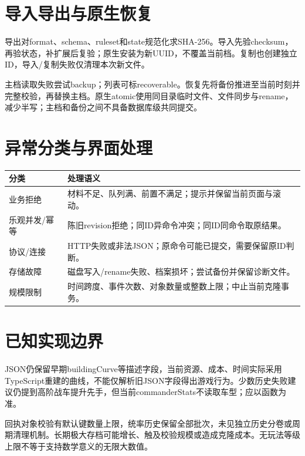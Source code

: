\section{导入导出与原生恢复}
导出对format、schema、ruleset和state规范化求SHA-256。导入先验checksum，再验状态，补扩展后复验；原生安装为新UUID，不覆盖当前档。复制也创建独立ID，导入/复制失败仅清理本次新文件。

主档读取失败尝试backup；列表可标recoverable。恢复先将备份推进至当前时刻并完整校验，再替换主档。原生atomic使用同目录临时文件、文件同步与rename，减少半写；主档和备份之间不具备数据库级共同提交。

\section{异常分类与界面处理}
\begin{small}\noindent\begin{tabularx}{\linewidth}{@{}P{29mm}Y@{}}
\toprule 分类 & 处理语义\\\midrule
业务拒绝 & 材料不足、队列满、前置不满足；提示并保留当前页面与滚动。\\
乐观并发/幂等 & 陈旧revision拒绝；同ID异命令冲突；同ID同命令取原结果。\\
协议/连接 & HTTP失败或非法JSON；原命令可能已提交，需要保留原ID判断。\\
存储故障 & 磁盘写入/rename失败、档案损坏；尝试备份并保留诊断文件。\\
规模限制 & 时间跨度、事件次数、对象数量或整数上限；中止当前克隆事务。\\\bottomrule
\end{tabularx}\end{small}

\section{已知实现边界}
JSON仍保留早期buildingCurve等描述字段，当前资源、成本、时间实际采用TypeScript重建的曲线，不能仅解析旧JSON字段得出游戏行为。少数历史失败建议仍提到高阶战车提升先手，但当前commanderStats不读取车型；应以函数为准。

回执对象校验有默认键数量上限，统率历史保留全部批次，未见独立历史分卷或周期清理机制。长期极大存档可能增长、触及校验规模或造成克隆成本。无玩法等级上限不等于支持数学意义的无限大数值。
